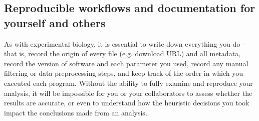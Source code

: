 \documentclass[10pt,letterpaper]{article}
\begin{document}





\subsection*{Reproducible workflows and documentation for yourself and others}
As with experimental biology, it is essential to write down everything you do - that is, record the origin of every file (e.g. download URL) and all metadata, record the version of software and each parameter you used, record any manual filtering or data preprocessing steps, and keep track of the order in which you executed each program. 
Without the ability to fully examine and reproduce your analysis, it will be impossible for you or your collaborators to assess whether the results are accurate, or even to understand how the heuristic decisions you took impact the conclusions made from an analysis. 
\end{document}
